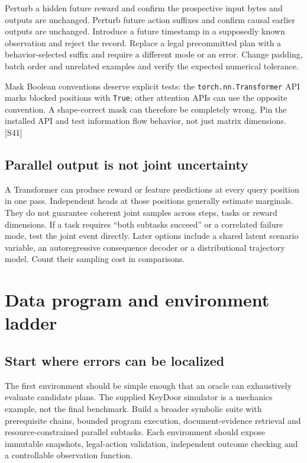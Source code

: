 \documentclass[
  11pt,
  a4paper,
]{article}
\begin{document}
Perturb a hidden future reward and confirm the prospective input bytes
and outputs are unchanged. Perturb future action suffixes and confirm
causal earlier outputs are unchanged. Introduce a future timestamp in a
supposedly known observation and reject the record. Replace a legal
precommitted plan with a behavior-selected suffix and require a
different mode or an error. Change padding, batch order and unrelated
examples and verify the expected numerical tolerance.

Mask Boolean conventions deserve explicit tests: the
\texttt{torch.nn.Transformer} API marks blocked positions with
\texttt{True}; other attention APIs can use the opposite convention. A
shape-correct mask can therefore be completely wrong. Pin the installed
API and test information flow behavior, not just matrix dimensions.
{[}S41{]}

\subsection{Parallel output is not joint
uncertainty}\label{parallel-output-is-not-joint-uncertainty}

A Transformer can produce reward or feature predictions at every query
position in one pass. Independent heads at those positions generally
estimate marginals. They do not guarantee coherent joint samples across
steps, tasks or reward dimensions. If a task requires ``both subtasks
succeed'' or a correlated failure mode, test the joint event directly.
Later options include a shared latent scenario variable, an
autoregressive consequence decoder or a distributional trajectory model.
Count their sampling cost in comparisons.

\section{Data program and environment
ladder}\label{data-program-and-environment-ladder}

\subsection{Start where errors can be
localized}\label{start-where-errors-can-be-localized}

The first environment should be simple enough that an oracle can
exhaustively evaluate candidate plans. The supplied KeyDoor simulator is
a mechanics example, not the final benchmark. Build a broader symbolic
suite with prerequisite chains, bounded program execution,
document-evidence retrieval and resource-constrained parallel subtasks.
Each environment should expose immutable snapshots, legal-action
validation, independent outcome checking and a controllable observation
function.
\end{document}
